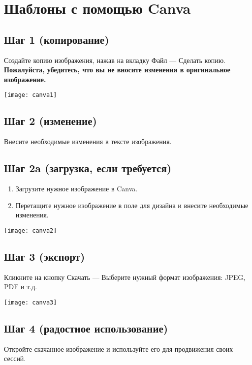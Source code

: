 \newpage
\section*{Шаблоны с помощью Canva}
\label{sec:templates}


\subsection*{Шаг 1 (копирование)}
Создайте копию изображения, нажав на вкладку Файл — Сделать копию.
\textbf{Пожалуйста, убедитесь, что вы не вносите изменения в оригинальное изображение.}
\begin{center}
\texttt{[image: canva1]}
\end{center}

\subsection*{Шаг 2 (изменение)}

Внесите необходимые изменения в тексте изображения. 


\subsection*{Шаг 2a (загрузка, если требуется)}
\begin{enumerate}
\item Загрузите нужное изображение в Canva. 
\item Перетащите нужное изображение в поле для дизайна и внесите необходимые изменения. 
\end{enumerate}

\begin{center}
\texttt{[image: canva2]}
\end{center}


\subsection*{Шаг 3 (экспорт)}
Кликните на кнопку Скачать — Выберите нужный формат изображения: JPEG, PDF и т.д.
\begin{center}
\texttt{[image: canva3]}
\end{center}


\subsection*{Шаг 4 (радостное использование)}
Откройте скачанное изображение и используйте его для продвижения своих сессий.

